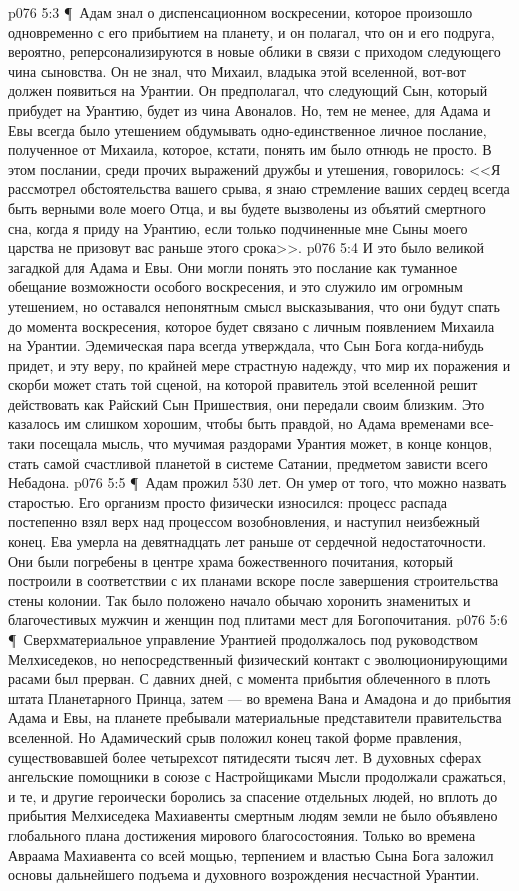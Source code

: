 \vs p076 5:3 \P\ Адам знал о диспенсационном воскресении, которое произошло одновременно с его прибытием на планету, и он полагал, что он и его подруга, вероятно, реперсонализируются в новые облики в связи с приходом следующего чина сыновства. Он не знал, что Михаил, владыка этой вселенной, вот\hyp{}вот должен появиться на Урантии. Он предполагал, что следующий Сын, который прибудет на Урантию, будет из чина Авоналов. Но, тем не менее, для Адама и Евы всегда было утешением обдумывать одно\hyp{}единственное личное послание, полученное от Михаила, которое, кстати, понять им было отнюдь не просто. В этом послании, среди прочих выражений дружбы и утешения, говорилось: <<Я рассмотрел обстоятельства вашего срыва, я знаю стремление ваших сердец всегда быть верными воле моего Отца, и вы будете вызволены из объятий смертного сна, когда я приду на Урантию, если только подчиненные мне Сыны моего царства не призовут вас раньше этого срока>>.
\vs p076 5:4 И это было великой загадкой для Адама и Евы. Они могли понять это послание как туманное обещание возможности особого воскресения, и это служило им огромным утешением, но оставался непонятным смысл высказывания, что они будут спать до момента воскресения, которое будет связано с личным появлением Михаила на Урантии. Эдемическая пара всегда утверждала, что Сын Бога когда\hyp{}нибудь придет, и эту веру, по крайней мере страстную надежду, что мир их поражения и скорби может стать той сценой, на которой правитель этой вселенной решит действовать как Райский Сын Пришествия, они передали своим близким. Это казалось им слишком хорошим, чтобы быть правдой, но Адама временами все\hyp{}таки посещала мысль, что мучимая раздорами Урантия может, в конце концов, стать самой счастливой планетой в системе Сатании, предметом зависти всего Небадона.
\vs p076 5:5 \P\ Адам прожил 530 лет. Он умер от того, что можно назвать старостью. Его организм просто физически износился: процесс распада постепенно взял верх над процессом возобновления, и наступил неизбежный конец. Ева умерла на девятнадцать лет раньше от сердечной недостаточности. Они были погребены в центре храма божественного почитания, который построили в соответствии с их планами вскоре после завершения строительства стены колонии. Так было положено начало обычаю хоронить знаменитых и благочестивых мужчин и женщин под плитами мест для Богопочитания.
\vs p076 5:6 \P\ Сверхматериальное управление Урантией продолжалось под руководством Мелхиседеков, но непосредственный физический контакт с эволюционирующими расами был прерван. С давних дней, с момента прибытия облеченного в плоть штата Планетарного Принца, затем --- во времена Вана и Амадона и до прибытия Адама и Евы, на планете пребывали материальные представители правительства вселенной. Но Адамический срыв положил конец такой форме правления, существовавшей более четырехсот пятидесяти тысяч лет. В духовных сферах ангельские помощники в союзе с Настройщиками Мысли продолжали сражаться, и те, и другие героически боролись за спасение отдельных людей, но вплоть до прибытия Мелхиседека Махиавенты смертным людям земли не было объявлено глобального плана достижения мирового благосостояния. Только во времена Авраама Махиавента со всей мощью, терпением и властью Сына Бога заложил основы дальнейшего подъема и духовного возрождения несчастной Урантии.
